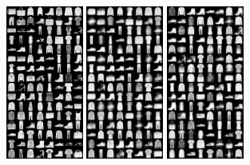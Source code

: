 \documentclass[a0]{a0poster}
\begin{document}
\begin{minipage}[t]{0.32\textwidth}
\begin{minipage}{1.0\columnwidth}
\begin{minipage}{\columnwidth}
  \includegraphics[width=0.19\textwidth, trim={0 13.75cm 3.15cm 0}, clip]{figures/fashion_jensen_reconst_sai.png}
  \includegraphics[width=0.19\textwidth, trim={0 13.75cm 3.15cm 0}, clip]{figures/fashion_hellinger_reconst_sai.png}
  \includegraphics[width=0.19\textwidth, trim={0 13.75cm 3.15cm 0}, clip]{figures/fashion_wasserstein_reconst_sai.png}\\
  \hspace*{1.4cm}
  \vspace{1cm}

\end{minipage}
\end{minipage}
\end{minipage}
\end{document}
